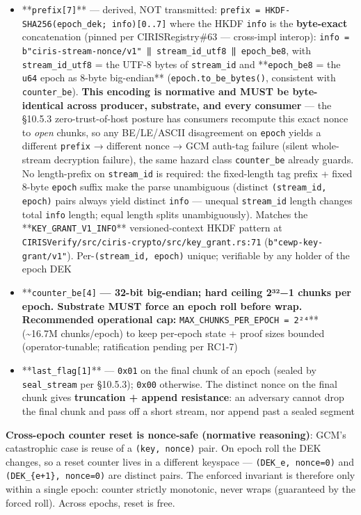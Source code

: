 \documentclass[10pt]{article}
\begin{document}
\begin{itemize}\setlength\itemsep{0pt}
\item **\texttt{prefix[7]}** — derived, NOT transmitted: \texttt{prefix = HKDF-SHA256(epoch\_dek; info)[0..7]} where the HKDF \texttt{info} is the \textbf{byte-exact} concatenation (pinned per CIRISRegistry\#63 — cross-impl interop): \texttt{info = b"ciris-stream-nonce/v1" ‖ stream\_id\_utf8 ‖ epoch\_be8}, with \texttt{stream\_id\_utf8} = the UTF-8 bytes of \texttt{stream\_id} and **\texttt{epoch\_be8} = the \texttt{u64} epoch as 8-byte big-endian** (\texttt{epoch.to\_be\_bytes()}, consistent with \texttt{counter\_be}). \textbf{This encoding is normative and MUST be byte-identical across producer, substrate, and every consumer} — the §10.5.3 zero-trust-of-host posture has consumers recompute this exact nonce to \textit{open} chunks, so any BE/LE/ASCII disagreement on \texttt{epoch} yields a different \texttt{prefix} → different nonce → GCM auth-tag failure (silent whole-stream decryption failure), the same hazard class \texttt{counter\_be} already guards. No length-prefix on \texttt{stream\_id} is required: the fixed-length tag prefix + fixed 8-byte \texttt{epoch} suffix make the parse unambiguous (distinct \texttt{(stream\_id, epoch)} pairs always yield distinct \texttt{info} — unequal \texttt{stream\_id} length changes total \texttt{info} length; equal length splits unambiguously). Matches the **\texttt{KEY\_GRANT\_V1\_INFO}** versioned-context HKDF pattern at \texttt{CIRISVerify/src/ciris-crypto/src/key\_grant.rs:71} (\texttt{b"cewp-key-grant/v1"}). Per-\texttt{(stream\_id, epoch)} unique; verifiable by any holder of the epoch DEK
\item **\texttt{counter\_be[4]}\textbf{ — 32-bit big-endian; hard ceiling 2³²−1 chunks per epoch. Substrate MUST force an epoch roll before wrap. Recommended operational cap: }\texttt{MAX\_CHUNKS\_PER\_EPOCH = 2²⁴}** (\textasciitilde{}16.7M chunks/epoch) to keep per-epoch state + proof sizes bounded (operator-tunable; ratification pending per RC1-7)
\item **\texttt{last\_flag[1]}** — \texttt{0x01} on the final chunk of an epoch (sealed by \texttt{seal\_stream} per §10.5.3); \texttt{0x00} otherwise. The distinct nonce on the final chunk gives \textbf{truncation + append resistance}: an adversary cannot drop the final chunk and pass off a short stream, nor append past a sealed segment
\end{itemize}


\textbf{Cross-epoch counter reset is nonce-safe (normative reasoning)}: GCM's catastrophic case is reuse of a \texttt{(key, nonce)} pair. On epoch roll the DEK changes, so a reset counter lives in a different keyspace — \texttt{(DEK\_e, nonce=0)} and \texttt{(DEK\_\{e+1\}, nonce=0)} are distinct pairs. The enforced invariant is therefore only within a single epoch: counter strictly monotonic, never wraps (guaranteed by the forced roll). Across epochs, reset is free.
\end{document}

